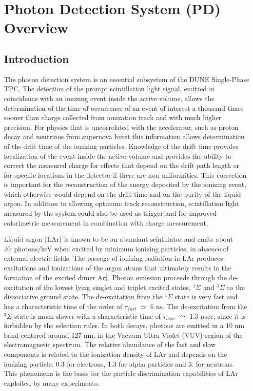 \section{Photon Detection System (PD) Overview}
\label{sec:fdsp-pd-ov}

\subsection{Introduction}
\label{sec:fdsp-pd-intro}

The photon detection system is an essential subsystem of the DUNE Single-Phase TPC. The detection of the prompt scintillation light signal, emitted in coincidence with an ionizing event inside the active volume, allows the determination of the time of occurrence of an event of interest a thousand times sooner than charge collected from ionization track and with much higher precision. For physics that is uncorrelated with the accelerator, such as proton decay and neutrinos from supernova burst  this information allows determination of the drift time of the ionizing particles.
Knowledge of the drift time provides localization of the event inside the active volume and provides the ability to correct the measured charge for  effects that depend on the drift path length or for specific locations in the detector if there are non-uniformities.  This correction is important for the reconstruction of the energy deposited by the ionizing event, which otherwise would depend on the drift time and on the purity of the liquid argon. In addition to allowing optimum track reconstruction, scintillation light measured by the system could also be used as trigger and for improved calorimetric measurement in combination with charge measurement.

Liquid argon (LAr) is known to be an abundant scintillator and emits about 40~photons/keV when excited  by minimum ionizing particles\cite{ref:lar-scint}, in absence of external electric fields. The passage of ionizing radiation in LAr produces excitations 
and ionizations of the argon atoms that ultimately results in the formation of the 
excited dimer Ar$^2_*$.  Photon emission proceeds through the de-excitation 
of the lowest lying singlet and triplet excited states, $^{1}\Sigma$ and 
$^{3}\Sigma$ to the dissociative ground state. The de-excitation from the 
$^{1}\Sigma$ state is very fast and has a characteristic time of the order of 
$\tau_{fast}$ $\simeq$ 6 ns. The de-excitation from the $^{3}\Sigma$ state is 
much slower with a characteristic time of $\tau_{slow}$ $\simeq$ 1.3 $\mu$sec, 
since it is forbidden by the selection rules. 
In both decays, photons are emitted in a 10 nm band centered around 127 nm, in 
the Vacuum Ultra Violet (VUV) region of the electromagnetic spectrum.
The relative abundance of the  fast and slow components is related to the ionization density of LAr and 
depends on the ionizing particle: 0.3 for electrons, 1.3 for alpha 
particles and 3. for neutrons. This phenomena is the basis for the  
particle discrimination capabilities of LAr exploited by many 
experiments.

